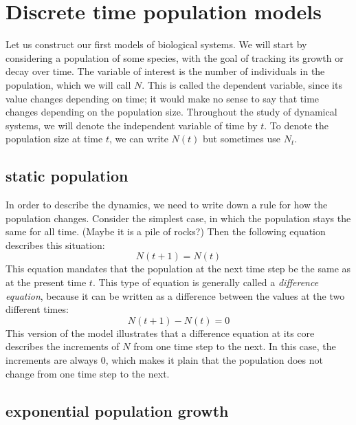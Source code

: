 \documentclass[
  letterpaper,
  DIV=11,
  numbers=noendperiod]{scrreprt}
\begin{document}
\hypertarget{discrete-time-population-models}{%
\section{Discrete time population
models}\label{discrete-time-population-models}}

\label{sec:model14}

Let us construct our first models of biological systems. We will start
by considering a population of some species, with the goal of tracking
its growth or decay over time. The variable of interest is the number of
individuals in the population, which we will call \(N\). This is called
the  dependent variable, since its value
changes depending on time; it would make no sense to say that time
changes depending on the population size. Throughout the study of
dynamical systems, we will denote the 
independent variable of time by \(t\). To denote the population size at
time \(t\), we can write \(N(t)\) but sometimes use \(N_t\).

\hypertarget{static-population}{%
\subsection{static population}\label{static-population}}

In order to describe the dynamics, we need to write down a rule for how
the population changes. Consider the simplest case, in which the
population stays the same for all time. (Maybe it is a pile of rocks?)
Then the following equation describes this situation: \[N(t+1) = N(t) \]
This equation mandates that the population at the next time step be the
same as at the present time \(t\). This type of equation is generally
called a  \emph{difference
equation}, because it can be written as a difference between the values
at the two different times: \[N(t+1) - N(t) = 0\] This version of the
model illustrates that a difference equation at its core describes the
increments of \(N\) from one time step to the next. In this case, the
increments are always 0, which makes it plain that the population does
not change from one time step to the next.

\hypertarget{exponential-population-growth}{%
\subsection{exponential population
growth}\label{exponential-population-growth}}
\end{document}
